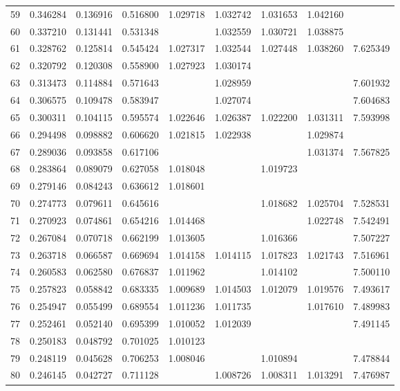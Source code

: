 \documentclass{elsarticle}
\begin{document}
\begin{center}
\begin{longtable}{|c|ccc|cccc|c|}
  59 & 0.346284 & 0.136916 & 0.516800 & 1.029718 & 1.032742 & 1.031653 & 1.042160 &  \\
  60 & 0.337210 & 0.131441 & 0.531348 &  & 1.032559 & 1.030721 & 1.038875 &  \\
  61 & 0.328762 & 0.125814 & 0.545424 & 1.027317 & 1.032544 & 1.027448 & 1.038260 & 7.625349 \\
  62 & 0.320792 & 0.120308 & 0.558900 & 1.027923 & 1.030174 &  &  &  \\
  63 & 0.313473 & 0.114884 & 0.571643 &  & 1.028959 &  &  & 7.601932 \\
  64 & 0.306575 & 0.109478 & 0.583947 &  & 1.027074 &  &  & 7.604683 \\
  65 & 0.300311 & 0.104115 & 0.595574 & 1.022646 & 1.026387 & 1.022200 & 1.031311 & 7.593998 \\
  66 & 0.294498 & 0.098882 & 0.606620 & 1.021815 & 1.022938 &  & 1.029874 &  \\
  67 & 0.289036 & 0.093858 & 0.617106 &  &  &  & 1.031374 & 7.567825 \\
  68 & 0.283864 & 0.089079 & 0.627058 & 1.018048 &  & 1.019723 &  &  \\
  69 & 0.279146 & 0.084243 & 0.636612 & 1.018601 &  &  &  &  \\
  70 & 0.274773 & 0.079611 & 0.645616 &  &  & 1.018682 & 1.025704 & 7.528531 \\
  71 & 0.270923 & 0.074861 & 0.654216 & 1.014468 &  &  & 1.022748 & 7.542491 \\
  72 & 0.267084 & 0.070718 & 0.662199 & 1.013605 &  & 1.016366 &  & 7.507227 \\
  73 & 0.263718 & 0.066587 & 0.669694 & 1.014158 & 1.014115 & 1.017823 & 1.021743 & 7.516961 \\
  74 & 0.260583 & 0.062580 & 0.676837 & 1.011962 &  & 1.014102 &  & 7.500110 \\
  75 & 0.257823 & 0.058842 & 0.683335 & 1.009689 & 1.014503 & 1.012079 & 1.019576 & 7.493617 \\
  76 & 0.254947 & 0.055499 & 0.689554 & 1.011236 & 1.011735 &  & 1.017610 & 7.489983 \\
  77 & 0.252461 & 0.052140 & 0.695399 & 1.010052 & 1.012039 &  &  & 7.491145 \\
  78 & 0.250183 & 0.048792 & 0.701025 & 1.010123 &  &  &  &  \\
  79 & 0.248119 & 0.045628 & 0.706253 & 1.008046 &  & 1.010894 &  & 7.478844 \\
  80 & 0.246145 & 0.042727 & 0.711128 &  & 1.008726 & 1.008311 & 1.013291 & 7.476987 \\

\end{longtable}
\end{center}
\end{document}
